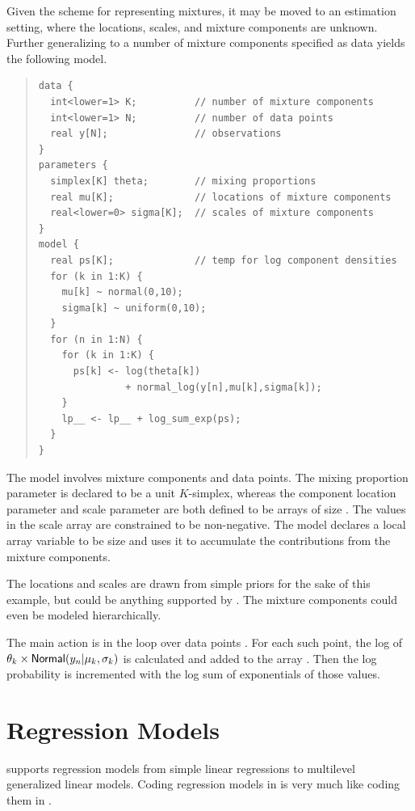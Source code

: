 Given the scheme for representing mixtures, it may be moved to an
estimation setting, where the locations, scales, and mixture
components are unknown.  Further generalizing to a number of mixture
components specified as data yields the following model.
%
\begin{quote}
\begin{Verbatim}
data {
  int<lower=1> K;          // number of mixture components
  int<lower=1> N;          // number of data points
  real y[N];               // observations
}
parameters {
  simplex[K] theta;        // mixing proportions
  real mu[K];              // locations of mixture components
  real<lower=0> sigma[K];  // scales of mixture components
}
model {
  real ps[K];              // temp for log component densities
  for (k in 1:K) {
    mu[k] ~ normal(0,10);
    sigma[k] ~ uniform(0,10);
  }
  for (n in 1:N) {
    for (k in 1:K) {
      ps[k] <- log(theta[k]) 
               + normal_log(y[n],mu[k],sigma[k]);
    }
    lp__ <- lp__ + log_sum_exp(ps);    
  }
}
\end{Verbatim}
\end{quote}
%
The model involves  mixture components and  data
points.  The mixing proportion parameter  is declared to
be a unit $K$-simplex, whereas the component location parameter
 and scale parameter  are both defined to be
arrays of size .  The values in the scale array 
are constrained to be non-negative.  The model declares a local 
array variable  to be size  and uses it to
accumulate the contributions from the mixture components.

The locations and scales are drawn from simple priors for the sake of
this example, but could be anything supported by \Stan.  The mixture
components  could even be modeled hierarchically.

The main action is in the loop over data points .  For each
such point, the log of $\theta_k \times
\mbox{\sf Normal}(y_n|\mu_k,\sigma_k)$ is calculated and added to the
array .  Then the log probability is incremented with the log
sum of exponentials of those values.





\chapter{Regression Models}

\noindent
\Stan supports regression models from simple linear regressions to
multilevel generalized linear models.  Coding regression models in
\Stan is very much like coding them in \BUGS.

